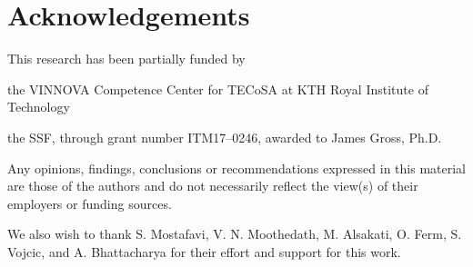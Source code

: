 \section*{Acknowledgements}\label{sec:acks}

This research has been partially funded by
\begin{enumerate*}[itemjoin={{; }}, itemjoin*={{; and }}]
    \item the VINNOVA Competence Center for \ac{TECoSA} at KTH Royal Institute of Technology
    \item the \ac{SSF}, through grant number ITM17--0246, awarded to James Gross, Ph.D.
\end{enumerate*}
Any opinions, findings, conclusions or recommendations expressed in this material are those of the authors and do not necessarily reflect the view(s) of their employers or funding sources.

We also wish to thank S. Mostafavi, V. N. Moothedath, M. Alsakati, O. Ferm, S. Vojcic, and A. Bhattacharya for their effort and support for this work.
